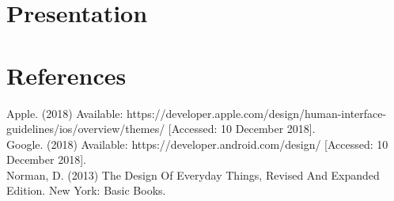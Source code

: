 \documentclass[]{article}
\begin{document}
\section{Presentation}

\section{References}
Apple. (2018) Available: https://developer.apple.com/design/human-interface-guidelines/ios/overview/themes/ [Accessed: 10 December 2018].\\

Google. (2018) Available: https://developer.android.com/design/ [Accessed: 10 December 2018]. \\

Norman, D. (2013) The Design Of Everyday Things, Revised And Expanded Edition. New York: Basic Books.\\
\end{document}
